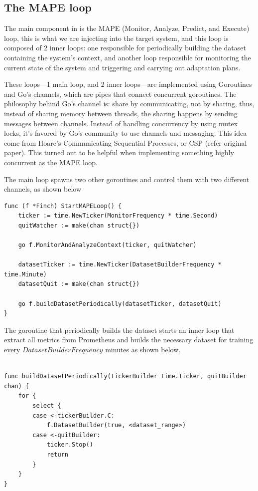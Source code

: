 \begin{appendices}
\subsection{The MAPE loop}
The main component in \projectname{} is the MAPE (Monitor, Analyze, Predict, and Execute) loop, this is what we are injecting into the target system, and this loop is composed of 2 inner loops: one responsible for periodically building the dataset containing the system's context, and another loop responsible for monitoring the current state of the system and triggering and carrying out adaptation plans.

These loops---1 main loop, and 2 inner loops---are implemented using Goroutines and Go's channels, which are pipes that connect concurrent goroutines. The philosophy behind Go's channel is: share by communicating, not by sharing, thus, instead of sharing memory between threads, the sharing happens by sending messages between channels.
Instead of handling concurrency by using mutex locks, it's favored by Go's community to use channels and messaging. This idea come from Hoare's Communicating Sequential Processes, or CSP (refer original paper).
This turned out to be helpful when implementing something highly concurrent as the MAPE loop.

The main loop spawns two other goroutines and control them with two different channels, as shown below

\begin{lstlisting}
func (f *Finch) StartMAPELoop() {
	ticker := time.NewTicker(MonitorFrequency * time.Second)
	quitWatcher := make(chan struct{})
	
	go f.MonitorAndAnalyzeContext(ticker, quitWatcher)
	
	datasetTicker := time.NewTicker(DatasetBuilderFrequency * time.Minute)
	datasetQuit := make(chan struct{})

	go f.buildDatasetPeriodically(datasetTicker, datasetQuit)
}
\end{lstlisting}

The goroutine that periodically builds the dataset starts an inner loop that extract all metrics from Prometheus and builds the necessary dataset for training every $DatasetBuilderFrequency$ minutes as shown below.

\lstset{aboveskip=80pt,belowskip=20pt}
\begin{lstlisting}

func buildDatasetPeriodically(tickerBuilder time.Ticker, quitBuilder chan) {
	for {
		select {
		case <-tickerBuilder.C:
			f.DatasetBuilder(true, <dataset_range>)
		case <-quitBuilder:
			ticker.Stop()
			return
		}
	}
}
\end{lstlisting}


\end{appendices}
